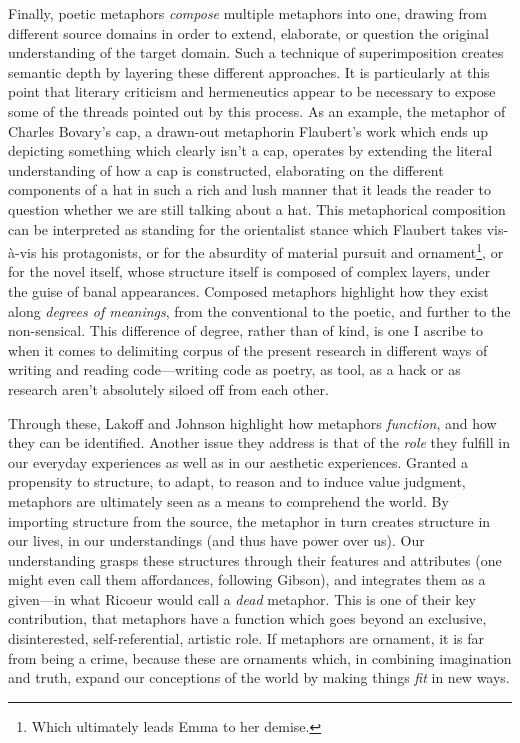 \documentclass{article}
\begin{document}
Finally, poetic metaphors \emph{compose} multiple metaphors into one, drawing from different source domains in order to extend, elaborate, or question the original understanding of the target domain. Such a technique of superimposition creates semantic depth by layering these different approaches. It is particularly at this point that literary criticism and hermeneutics appear to be necessary to expose some of the threads pointed out by this process. As an example, the metaphor of Charles Bovary's cap, a drawn-out metaphorin Flaubert's work which ends up depicting something which clearly isn't a cap, operates by extending the literal understanding of how a cap is constructed, elaborating on the different components of a hat in such a rich and lush manner that it leads the reader to question whether we are still talking about a hat. This metaphorical composition can be interpreted as standing for the orientalist stance which Flaubert takes vis-à-vis his protagonists, or for the absurdity of material pursuit and ornament\footnote{Which ultimately leads Emma to her demise.}, or for the novel itself, whose structure itself is composed of complex layers, under the guise of banal appearances. Composed metaphors highlight how they exist along \emph{degrees of meanings}, from the conventional to the poetic, and further to the non-sensical. This difference of degree, rather than of kind, is one I ascribe to when it comes to delimiting corpus of the present research in different ways of writing and reading code—writing code as poetry, as tool, as a hack or as research aren't absolutely siloed off from each other.

Through these, Lakoff and Johnson highlight how metaphors \emph{function}, and how they can be identified. Another issue they address is that of the \emph{role} they fulfill in our everyday experiences as well as in our aesthetic experiences. Granted a propensity to structure, to adapt, to reason and to induce value judgment, metaphors are ultimately seen as a means to comprehend the world. By importing structure from the source, the metaphor in turn creates structure in our lives, in our understandings (and thus have power over us). Our understanding grasps these structures through their features and attributes (one might even call them affordances, following Gibson\cite{gibson_ecological_1986}), and integrates them as a given—in what Ricoeur would call a \emph{dead} metaphor. This is one of their key contribution, that metaphors have a function which goes beyond an exclusive, disinterested, self-referential, artistic role. If metaphors are ornament, it is far from being a crime, because these are ornaments which, in combining imagination and truth, expand our conceptions of the world by making things \emph{fit} in new ways.
\end{document}
